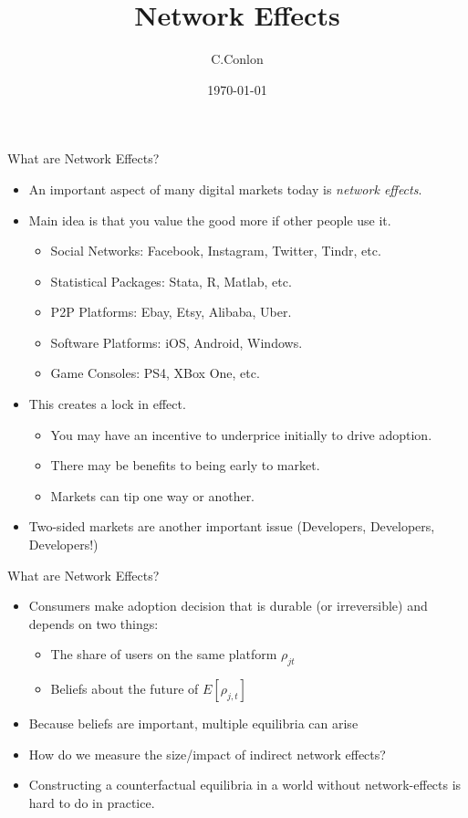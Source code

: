 \documentclass[aspectratio=169,11pt]{beamer}
\title [Dynamic Oligopoly I]{Network Effects}
\author{C.Conlon }
\institute{Grad IO }
\date{\today}
\begin{document}
\begin{frame}
\titlepage
\end{frame}

\begin{frame}{What are Network Effects?}
\begin{itemize}
\item An important aspect of many digital markets today is \textit{network effects}.
\item Main idea is that you value the good more if other people use it.
\begin{itemize}
\item Social Networks: Facebook, Instagram, Twitter, Tindr, etc.
\item Statistical Packages: Stata, R, Matlab, etc.
\item P2P Platforms: Ebay, Etsy, Alibaba, Uber.
\item Software Platforms: iOS, Android, Windows.
\item Game Consoles: PS4, XBox One, etc.
\end{itemize}
\item This creates a \alert{lock in} effect.
\begin{itemize}
\item You may have an incentive to underprice initially to drive adoption.
\item There may be benefits to being early to market.
\item Markets can \alert{tip} one way or another.
\end{itemize}
\item Two-sided markets are another important issue (Developers, Developers, Developers!) 
\end{itemize}
\end{frame}


\begin{frame}{What are Network Effects?}
\begin{itemize}
\item Consumers make adoption decision that is durable (or irreversible) and depends on two things:
\begin{itemize}
\item The share of users on the same platform $\rho_{jt}$
\item Beliefs about the future of $E[\rho_{j,t}]$
\end{itemize}
\item Because beliefs are important, multiple equilibria can arise
\item How do we measure the size/impact of indirect network effects?
\item Constructing a counterfactual equilibria in a world without network-effects is hard to do in practice.
\end{itemize}
\end{frame}
\end{document}
